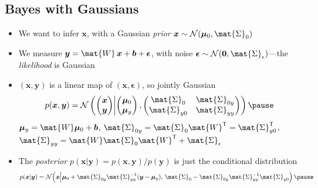 \begin{slide}
\section[-2]{Bayes with Gaussians}

\begin{PauseHighLight}
  \begin{itemize}\squeeze
  \item We want to infer $\bm{x}$, with a Gaussian \emph{prior}
    $\bm{x}\sim \normal{\bm{\mu}_0, \mat{\Sigma}_0}$\pause
  \item We measure $\bm{y} = \mat{W}\,\bm{x} + \bm{b} + \bm{\epsilon}$, with
    noise $\bm{\epsilon}\sim\normal{\bm{0},\mat{\Sigma}_\epsilon}$\pause---the
    \emph{likelihood} is Gaussian\pauseb
  \item $(\bm{x},\bm{y})$ is a linear map of $(\bm{x},\bm{\epsilon})$, so
    jointly Gaussian
    \begin{align*}
      p(\bm{x}, \bm{y}) = \mathcal{N}\bra{
      \begin{pmatrix}
        \bm{x} \\ \bm{y}
      \end{pmatrix}
      \middle|
      \begin{pmatrix}
        \bm{\mu}_0 \\ \bm{\mu}_y
      \end{pmatrix} ,
      \begin{pmatrix}
        \mat{\Sigma}_0 & \mat{\Sigma}_{0y} \\
        \mat{\Sigma}_{y0} & \mat{\Sigma}_{yy}
      \end{pmatrix}
      }\pause
    \end{align*}
    {\small $\bm{\mu}_y = \mat{W}\bm{\mu}_0 + \bm{b}$,
      $\mat{\Sigma}_{0y} = \mat{\Sigma}_0\mat{W}^\tr = \mat{\Sigma}_{y0}^\tr$,
      $\mat{\Sigma}_{yy} = \mat{W}\mat{\Sigma}_0\mat{W}^\tr + \mat{\Sigma}_\epsilon$}\pause
  \item The \emph{posterior} $p(\bm{x}|\bm{y}) = p(\bm{x},\bm{y})/p(\bm{y})$ is
    just the conditional distribution
    \begin{align*}
      p(\bm{x}|\bm{y}) = \normal{\bm{x}\middle|\bm{\mu}_0 +
      \mat{\Sigma}_{0y}\mat{\Sigma}_{yy}^{-1}(\bm{y}-\bm{\mu}_y),\,
      \mat{\Sigma}_0 - \mat{\Sigma}_{0y}\mat{\Sigma}_{yy}^{-1}\mat{\Sigma}_{y0}
      }\pause
    \end{align*}
  \end{itemize}
\end{PauseHighLight}


\end{slide}



